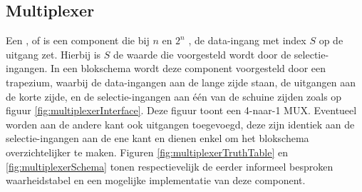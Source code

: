 \subsection{Multiplexer}
Een ,  of  is een component die bij $n$  en $2^n$ , de data-ingang met index $S$ op de uitgang zet. Hierbij is $S$ de waarde die voorgesteld wordt door de selectie-ingangen. In een blokschema wordt deze component voorgesteld door een trapezium, waarbij de data-ingangen aan de lange zijde staan, de uitgangen aan de korte zijde, en de selectie-ingangen aan \'e\'en van de schuine zijden zoals op figuur \ref{fig:multiplexerInterface}. Deze figuur toont een 4-naar-1 MUX. Eventueel worden aan de andere kant ook uitgangen toegevoegd, deze zijn identiek aan de selectie-ingangen aan de ene kant en dienen enkel om het blokschema overzichtelijker te maken. Figuren \ref{fig:multiplexerTruthTable} en \ref{fig:multiplexerSchema} tonen respectievelijk de eerder informeel besproken waarheidstabel en een mogelijke implementatie van deze component.
